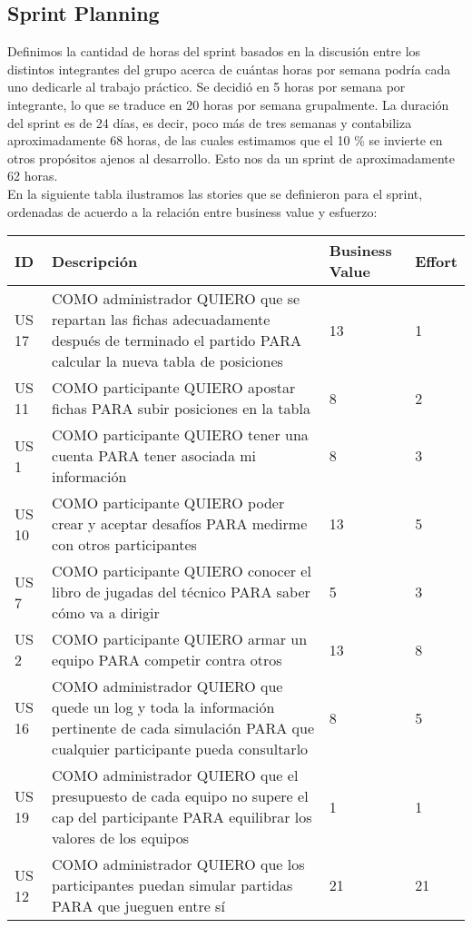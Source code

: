\subsection{Sprint Planning}

\indent Definimos la cantidad de horas del sprint basados en la discusión entre los distintos integrantes del grupo acerca de cuántas horas por semana podría cada uno dedicarle al trabajo práctico. Se decidió en 5 horas por semana por integrante, lo que se traduce en 20 horas por semana grupalmente. La duración del sprint es de 24 días, es decir, poco más de tres semanas y contabiliza aproximadamente 68 horas, de las cuales estimamos que el 10 \% se invierte en otros propósitos ajenos al desarrollo. Esto nos da un sprint de aproximadamente 62 horas.\\

\indent En la siguiente tabla ilustramos las stories que se definieron para el sprint, ordenadas de acuerdo a la relación entre business value y esfuerzo:\\

\begin{center}
  \begin{tabular}{| l | p{10cm} | l | l | }
    \hline
ID & Descripción & Business Value & Effort\\  \hline
US 17 & COMO administrador QUIERO que se repartan las fichas adecuadamente después de terminado el partido PARA calcular la nueva tabla de posiciones & 13 & 1\\  \hline
US 11 & COMO participante QUIERO apostar fichas PARA subir posiciones en la tabla & 8 & 2\\  \hline
US 1 & COMO participante QUIERO tener una cuenta PARA tener asociada mi información & 8 & 3\\  \hline
US 10 & COMO participante QUIERO poder crear y aceptar desafíos PARA medirme con otros participantes & 13 & 5\\  \hline
US 7 & COMO participante QUIERO conocer el libro de jugadas del técnico PARA saber cómo va a dirigir & 5 & 3\\  \hline
US 2 & COMO participante QUIERO armar un equipo PARA competir contra otros & 13 & 8\\  \hline
US 16 & COMO administrador QUIERO que quede un log y toda la información pertinente de cada simulación PARA que cualquier participante pueda consultarlo & 8 & 5\\  \hline
US 19 & COMO administrador QUIERO que el presupuesto de cada equipo no supere el cap del participante PARA equilibrar los valores de los equipos & 1 & 1\\  \hline
US 12 & COMO administrador QUIERO que los participantes puedan simular partidas PARA que jueguen entre sí & 21 & 21\\  \hline
  \end{tabular}
\end{center}


